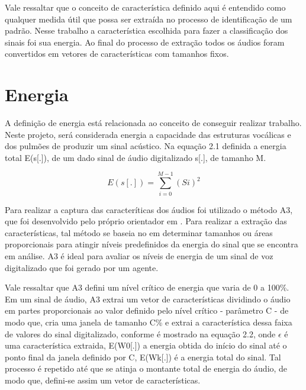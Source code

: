 \documentclass[a4paper,12pt,twoside,openright]{report}
\begin{document}
\par Vale ressaltar que o conceito de caracter\'{i}stica definido aqui \'{e} entendido como qualquer medida \'{u}til que possa ser extra\'{i}da no processo de identifica{\c c}\~{a}o de um padr\~{a}o. Nesse trabalho a caracter\'{i}stica escolhida para fazer a classifica{\c c}\~{a}o dos sinais foi sua energia. Ao final do processo de extra{\c c}\~{a}o todos os \'{a}udios foram convertidos em vetores de caracter\'{i}sticas com tamanhos fixos.

\section{Energia}
\label{energia}
\par A defini{\c c}\~{a}o de energia est\'{a} relacionada ao conceito de conseguir realizar trabalho. Neste projeto, ser\'{a} considerada energia a capacidade das estruturas voc\'{a}licas e dos pulm\~{o}es de produzir um sinal ac\'{u}stico. Na equa{\c c}\~{a}o 2.1 definida a energia total E(s[.]), de um dado sinal de \'{a}udio digitalizado s[.], de tamanho M.

\begin{equation}
	E(s[.])=\sum_{i = 0}^{M-1} (Si)^2
\end{equation}

\par Para realizar a captura das caracter\'{i}ticas dos \'{a}udios foi utilizado o m\'{e}todo A3, que foi desenvolvido pelo pr\'{o}prio orientador em \cite{Guido_tutorial}. Para realizar a extra{\c c}\~{a}o das caracter\'{i}sticas, tal m\'{e}todo se baseia no em determinar tamanhos ou \'{a}reas proporcionais para atingir n\'{i}veis predefinidos da energia do sinal que se encontra em an\'{a}lise. A3 \'{e} ideal para avaliar os n\'{i}veis de energia de um sinal de voz digitalizado que foi gerado por um agente.
\par Vale ressaltar que A3 defini um n\'{i}vel cr\'{i}tico de energia que varia de 0 a 100{\%}. Em um sinal de \'{a}udio, A3 extrai um vetor de caracter\'{i}sticas dividindo o \'{a}udio em partes proporcionais ao valor definido pelo n\'{i}vel cr\'{i}tico - par\^{a}metro C - de modo que, cria uma janela de tamanho C{\%} e extrai a caracter\'{i}stica dessa faixa de valores do sinal digitalizado, conforme \'{e} mostrado na equa{\c c}\~{a}o 2.2, onde $\epsilon$ \'{e} uma caracter\'{i}stica extraida, E(W0[.]) a energia obtida do in\'{i}cio do sinal at\'{e} o ponto final da janela definido por C, E(Wk[.]) \'{e} a energia total do sinal. Tal processo \'{e} repetido at\'{e} que se atinja o montante total de energia do \'{a}udio, de modo que, defini-se assim um vetor de caracter\'{i}sticas. 
\end{document}
